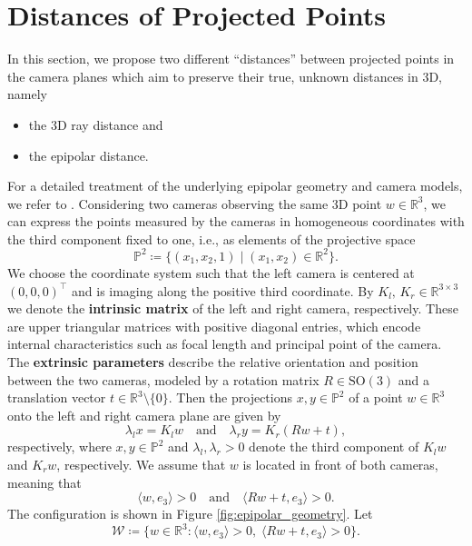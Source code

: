 \documentclass[10pt, twocolumn]{article}
\theoremstyle{definition}
\newcommand{\R}{{\ensuremath{\mathbb{R}}}}
\begin{document}
\section{Distances of Projected Points} \label{sec:model}
In this section, we propose two different  \enquote{distances} between projected points in the camera planes
which aim to preserve their true, unknown  distances in 3D, namely
\begin{itemize}
\item the 3D ray distance and
\item the epipolar distance.
\end{itemize}
For a detailed treatment of the underlying epipolar geometry and camera models, we refer to \cite{hartley2004multiple,prince2012computer,steger2022multi}.
Considering two cameras observing the same 3D point $w\in \R^3$, we
can express the points measured by the cameras in homogeneous coordinates with the third component fixed to one, i.e.,
as elements of the projective space
$$
\mathbb P^2\coloneqq \{(x_1,x_2,1) \mid (x_1,x_2)\in\R^2\}.
$$ 
We choose the coordinate system such that the left camera is centered at $(0,0,0)^\top$ and is imaging along the positive third coordinate.
By $K_l,\, K_r \in \R^{3\times3}$ we denote the \textbf{intrinsic matrix} of the left and right camera, respectively. These are upper triangular matrices with positive diagonal entries, which encode internal characteristics such as focal length and principal point of the camera. The \textbf{extrinsic parameters} describe the relative orientation and position between the two cameras, modeled by a rotation matrix $R\in \text{SO}(3)$ and a translation vector $t \in \R^3\setminus\{0\}$.
Then the projections  $x,y \in \mathbb P^2$ of a point $w \in \R^3$ 
onto the left and right camera plane are given by
\begin{equation} \label{eq:model}
\lambda_l x = K_l w 
\quad \text{and} \quad
\lambda_r y = K_r (Rw + t),
\end{equation}
respectively,
where $x,y \in \mathbb P^2$ and $\lambda_l,\lambda_r >0$ denote the third component of $K_lw$ and $K_r w$, respectively.
We assume that $w$ is located in front of both cameras, meaning that 
\begin{equation} \label{eq:front}
\langle w, e_3\rangle>0 \quad \text{and} \quad \langle Rw+t,e_3\rangle>0.
\end{equation}
The configuration is shown in Figure \ref{fig:epipolar_geometry}.
Let 
$$
\mathcal W \coloneqq \{w \in \R^3: \langle w, e_3\rangle>0,\;\langle Rw+t,e_3\rangle>0\}.
$$
\end{document}

